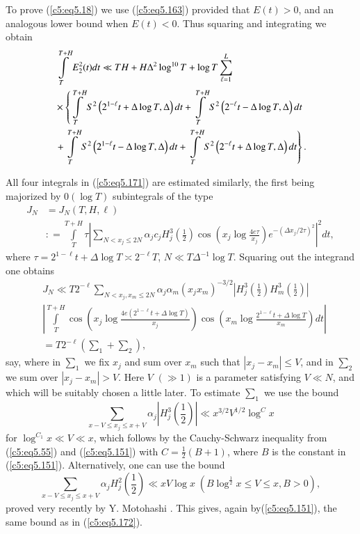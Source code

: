 To prove (\ref{c5:eq5.18}) we use (\ref{c5:eq5.163}) provided that
$E(t) > 0$, and an analogous lower bound when $E(t) < 0$. Thus
squaring and integrating we obtain 
\pageoriginale
{\fontsize{10pt}{12pt}\selectfont
\begin{align}
&\int\limits^{T+H}_T E^2_2 (t) dt \ll TH + H\Delta^2 \log^{10} T +
  \log T \sum\limits^L_{\ell=1}\notag\\  
&\times \left\{ \int\limits^{T+H}_T
S^2\left(2^{1-\ell} t + \Delta \log T, \Delta\right) dt +
\int\limits^{T+H}_T S^2 \left(2^{-\ell} t -\Delta \log T,\Delta\right)
dt \right.\notag\\  
&\left. +\int\limits^{T+H}_T S^2 \left(2^{1-\ell} t -\Delta \log
T,\Delta\right) dt+ \int\limits^{T+H}_T S^2 \left(2^{-\ell} t + \Delta
\log T, \Delta \right)dt 
\right\}.\label{c5:eq5.171} 
\end{align}}

All four integrals in (\ref{c5:eq5.171}) are estimated similarly, the
first being majorized by $0(\log T)$ subintegrals of the type 
\begin{align*}
J_N &= J_N (T,H,\ell)\\
& : = \int\limits^{T+H}_T \tau \left| \sum\limits_{N < x_j \leq 2N}
\alpha_j c_j H^3_j\left(\frac{1}{2}\right)  \cos \left(x_j \log
\frac{4e\tau}{x_j}\right) e^{-(\Delta x_j / 2\tau)^2}\right|^2 dt, 
\end{align*}
where $\tau = 2^{1-\ell} t + \Delta \log T \asymp 2^{-\ell} T$, $N \ll
T\Delta^{-1} \log T$. Squaring out the integrand one obtains  
\begin{align*}
& J_N \ll T2^{-\ell} \sum\limits_{N < x_j, x_m \leq 2N} \alpha_j
\alpha_m (x_j x_m)^{-3/2} \left|H^3_j \left(\frac{1}{2}\right) H^3_m
\left(\frac{1}{2} \right)\right|  \\ 
& \left| \int\limits^{T+H}_T \cos \left(x_j \log \frac{4e (2^{1-\ell} t
  + \Delta \log T)}{x_j} \right) \cos  \left( x_m \log
\frac{2^{1-\ell} t + \Delta \log T}{x_m}\right) dt \right|\\ 
& = T 2^{-\ell} \left(\sum_1 + \sum_2 \right),
\end{align*}
 say, where  in $\sum_1$ we fix $x_j$ and sum over $x_m$ such that
 $|x_j - x_m| \leq V$, and in $\sum_2$ we sum over $|x_j - x_m| >
 V$. Here $V$ $(\gg 1)$ is a parameter satisfying $V \ll N$, and which
 will be suitably chosen a little later. To estimate $\sum_1$ we use
 the bound 
\begin{equation}
\sum\limits_{x - V\leq x_j \leq x + V} \alpha_j \left| H^3_j
\left(\frac{1}{2} \right)\right| \ll x^{3/2} V^{1/2} \log^C
x\label{c5:eq5.172} 
\end{equation}
for $\log^{C_1} x \ll V \ll x$, which follows by the Cauchy-Schwarz
inequality from (\ref{c5:eq5.55}) and (\ref{c5:eq5.151}) with $C
=\frac{1}{2} (B+1)$, where $B$ is the constant in
(\ref{c5:eq5.151}). Alternatively, one can use the bound 
$$
\sum\limits_{x - V \leq x_j \leq x+V} \alpha_j H^2_j \left(\frac{1}{2}
\right) \ll x V \log x \; \left(B \log^{\frac{1}{2}} x \leq V \leq x, B >
0\right), 
$$
proved very recently by Y. Motohashi \cite{Motohashi7}. This gives,
again by\break (\ref{c5:eq5.151}), the same bound as in
(\ref{c5:eq5.172}). 

